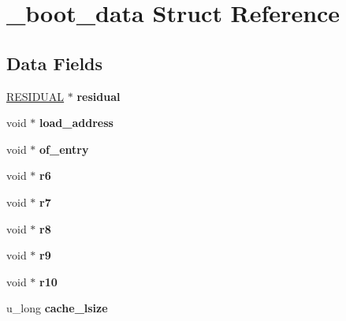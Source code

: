 \hypertarget{struct__boot__data}{}\section{\+\_\+boot\+\_\+data Struct Reference}
\label{struct__boot__data}
\subsection*{Data Fields}
\begin{DoxyCompactItemize}
\item 
\mbox{\label{struct__boot__data_a2cdaf32c514125a18f7bd4f4b4aada6e}} 
\mbox{\hyperlink{struct__RESIDUAL}{R\+E\+S\+I\+D\+U\+AL}} $\ast$ {\bfseries residual}
\item 
\mbox{\label{struct__boot__data_af2324de681b3a251800208e2d48d456e}} 
void $\ast$ {\bfseries load\+\_\+address}
\item 
\mbox{\label{struct__boot__data_a1feea0ce0de753eeb039617143af9eeb}} 
void $\ast$ {\bfseries of\+\_\+entry}
\item 
\mbox{\label{struct__boot__data_a02e9b4017679de90c53a3465f0421937}} 
void $\ast$ {\bfseries r6}
\item 
\mbox{\label{struct__boot__data_af47fe7a5dfd7a00a91333587f0cb0591}} 
void $\ast$ {\bfseries r7}
\item 
\mbox{\label{struct__boot__data_a40f8c4e2d8fda437b5b572c4fe7cf909}} 
void $\ast$ {\bfseries r8}
\item 
\mbox{\label{struct__boot__data_a3e774ecc6ff4f1c2d592c5b16f3bd72c}} 
void $\ast$ {\bfseries r9}
\item 
\mbox{\label{struct__boot__data_a913ebfdfc425db8a0e37e29d4f7035e5}} 
void $\ast$ {\bfseries r10}
\item 
\mbox{\label{struct__boot__data_a7b800b6b1b23f036c76f1cb23cace2ab}} 
u\+\_\+long {\bfseries cache\+\_\+lsize}
\item 
\mbox{\label{struct__boot__data_ae3fa718ae69a36ca0c62c10d6cec63f1}} 

\end{DoxyCompactItemize}
